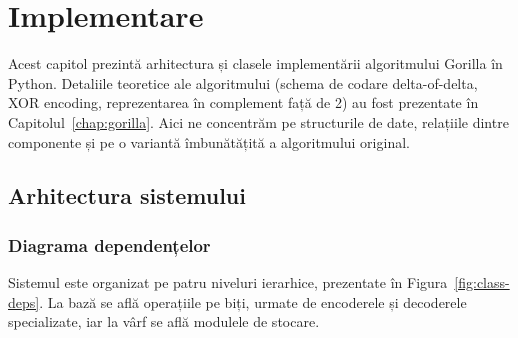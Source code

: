 \chapter{Implementare}

Acest capitol prezintă arhitectura și clasele implementării algoritmului Gorilla în Python. Detaliile teoretice ale algoritmului (schema de codare delta-of-delta, XOR encoding, reprezentarea în complement față de 2) au fost prezentate în Capitolul~\ref{chap:gorilla}. Aici ne concentrăm pe structurile de date, relațiile dintre componente și pe o variantă îmbunătățită a algoritmului original.

\section{Arhitectura sistemului}

\subsection{Diagrama dependențelor}

Sistemul este organizat pe patru niveluri ierarhice, prezentate în Figura~\ref{fig:class-deps}. La bază se află operațiile pe biți, urmate de encoderele și decoderele specializate, iar la vârf se află modulele de stocare.

